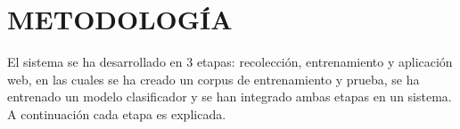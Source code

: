 \section{METODOLOGÍA}

El sistema se ha desarrollado en 3 etapas: recolección, entrenamiento y aplicación web, en las cuales se ha creado un corpus de entrenamiento y prueba, se ha entrenado un modelo clasificador y se han integrado ambas etapas en un sistema. A continuación cada etapa es explicada.




